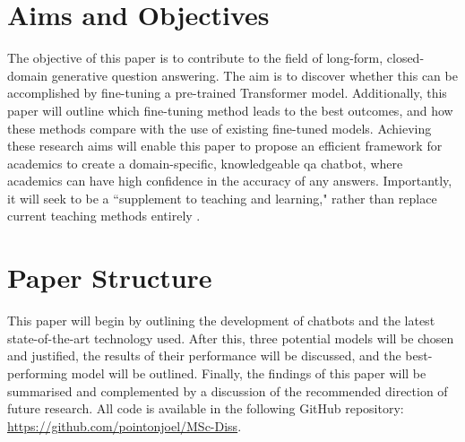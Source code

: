 \section{Aims and Objectives} %
\label{sec:intro_aims_and_objectives}

The objective of this paper is to contribute to the field of long-form, closed-domain generative question answering. The aim is to discover whether this can be accomplished by fine-tuning a pre-trained Transformer model. Additionally, this paper will outline which fine-tuning method leads to the best outcomes, and how these methods compare with the use of existing fine-tuned models. Achieving these research aims will enable this paper to propose an efficient framework for academics to create a domain-specific, knowledgeable \acrshort{qa} chatbot, where academics can have high confidence in the accuracy of any answers. Importantly, it will seek to be a ``supplement to teaching and learning," rather than replace current teaching methods entirely \citep{Nee2023ExploringTT}. 





\section{Paper Structure}
\label{sec:intro_paper_structure}

This paper will begin by outlining the development of chatbots and the latest state-of-the-art technology used. After this, three potential models will be chosen and justified, the results of their performance will be discussed, and the best-performing model will be outlined. Finally, the findings of this paper will be summarised and complemented by a discussion of the recommended direction of future research. All code is available in the following GitHub repository: \url{https://github.com/pointonjoel/MSc-Diss}. %

